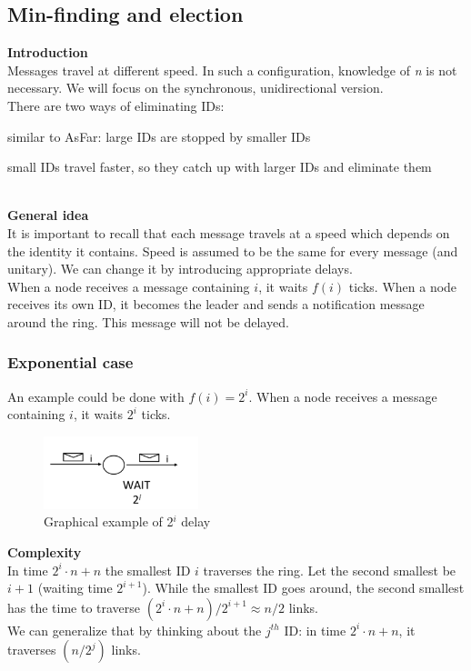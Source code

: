 \documentclass[paper=a4, fontsize=11pt]{scrartcl} %
\numberwithin{equation}{section} %
\numberwithin{figure}{section} %
\numberwithin{table}{section} %
\begin{document}
\subsection*{Min-finding and election}
\textbf{Introduction}\\
Messages travel at different speed. In such a configuration, knowledge of \textit{n} is not necessary. We will focus on the synchronous, unidirectional version.\\
There are two ways of eliminating IDs: 
\begin{compactenum}
	\item similar to AsFar: large IDs are stopped by smaller IDs
	\item small IDs travel faster, so they catch up with larger IDs and eliminate them
\end{compactenum}
~ \\ 
\textbf{General idea}\\
It is important to recall that each message travels at a speed which depends on the identity it contains.
Speed is assumed to be the same for every message (and unitary). We can change it by introducing appropriate delays.\\
When a node receives a message containing $i$, it waits $f(i)$ ticks. When a node receives its own ID, it becomes the leader and sends a notification message around the ring. This message will not be delayed.

\subsubsection*{Exponential case}
An example could be done with $f(i) = 2^i$. When a node receives a message containing $i$, it waits $2^i$ ticks. 
\begin{figure}[H]
  \centering
  \includegraphics[width=0.4\textwidth]{img/fi.png}
  \caption{Graphical example of 2$^i$ delay}
  \label{fig:boat1}
\end{figure}

\textbf{Complexity} \\ 
In time $2^i\cdot n + n$ the smallest ID $i$ traverses the ring. Let the second smallest be $i+1$ (waiting time $2^{i+1}$). While the smallest ID goes around, the second smallest has the time to traverse $(2^i\cdot n + n)/ 2^{i+1} \approx n/2$ links.\\
We can generalize that by thinking about the $j^{th}$ ID: in time $2^i\cdot n + n$, it traverses $(n/2^j)$ links.
\end{document}
